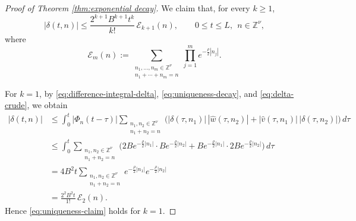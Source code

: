 \documentclass[10pt,a4paper]{amsart}
\begin{document}
\begin{proof}[Proof of Theorem \ref{thm:exponential decay}]
We claim that, for every $k\geq 1$,
\begin{equation}\label{eq:uniqueness-claim}
|\delta(t,n)|
\leq
\frac{2^{k+1}B^{k+1}t^k}{k!}\,\mathcal{E}_{k+1}(n),
\qquad
0\leq t\leq L,\ \ n\in \mathbb{Z}^{\nu},
\end{equation}
where
\[
\mathcal{E}_{m}(n)
:=
\sum_{\substack{n_1,\dots,n_m\in \mathbb{Z}^{\nu}\\ n_1+\cdots+n_m=n}}
\prod_{j=1}^{m} e^{-\frac{\rho}{2}|n_j|}.
\]

For $k=1$, by \eqref{eq:difference-integral-delta}, \eqref{eq:uniqueness-decay},
and \eqref{eq:delta-crude}, we obtain
\begin{align*}
|\delta(t,n)|
&\leq
\int_0^t |\Phi_n(t-\tau)|
\sum_{\substack{n_1,n_2\in \mathbb{Z}^{\nu}\\ n_1+n_2=n}}
\Big(
|\delta(\tau,n_1)|\,|\widehat w(\tau,n_2)|
+
|\widehat v(\tau,n_1)|\,|\delta(\tau,n_2)|
\Big)\,d\tau \\
&\leq
\int_0^t
\sum_{\substack{n_1,n_2\in \mathbb{Z}^{\nu}\\ n_1+n_2=n}}
\Big(
2B e^{-\frac{\rho}{2}|n_1|}\cdot B e^{-\frac{\rho}{2}|n_2|}
+
B e^{-\frac{\rho}{2}|n_1|}\cdot 2B e^{-\frac{\rho}{2}|n_2|}
\Big)\,d\tau \\
&=
4B^2 t
\sum_{\substack{n_1,n_2\in \mathbb{Z}^{\nu}\\ n_1+n_2=n}}
e^{-\frac{\rho}{2}|n_1|}e^{-\frac{\rho}{2}|n_2|} \\
&=
\frac{2^{2}B^{2}t}{1!}\,\mathcal{E}_{2}(n).
\end{align*}
Hence \eqref{eq:uniqueness-claim} holds for $k=1$.


\end{proof}
\end{document}
